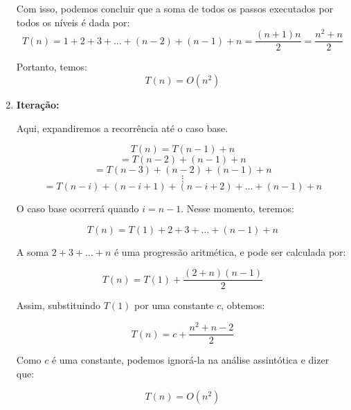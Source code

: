 \begin{enumerate}
    Com isso, podemos concluir que a soma de todos os passos executados por todos os níveis é dada por:
    \[
    T(n) = 1 + 2 + 3 + \ldots + (n - 2) + (n - 1) + n = \frac{(n + 1) n}{2} = \frac{n^2 + n}{2}
    \]
    
    Portanto, temos:
    \[
    T(n) = O(n^2)
    \]

    \item \textbf{Iteração:}

Aqui, expandiremos a recorrência até o caso base.

\[
T(n) = T(n-1) + n
\]
\[
= T(n-2) + (n - 1) + n
\]
\[
= T(n-3) + (n - 2) + (n - 1) + n
\]
\[
\vdots
\]
\[
= T(n-i) + (n - i + 1) + (n - i + 2) + \dots + (n - 1) + n
\]

O caso base ocorrerá quando \( i = n - 1 \). Nesse momento, teremos:

\[
T(n) = T(1) + 2 + 3 + \dots + (n - 1) + n
\]

A soma \( 2 + 3 + \dots + n \) é uma progressão aritmética, e pode ser calculada por:

\[
T(n) = T(1) + \frac{(2 + n)(n - 1)}{2}
\]

Assim, substituindo \( T(1) \) por uma constante \( c \), obtemos:

\[
T(n) = c + \frac{n^2 + n - 2}{2}
\]

Como \( c \) é uma constante, podemos ignorá-la na análise assintótica e dizer que:

\[
T(n) = O(n^2)
\]

    
\end{enumerate}







